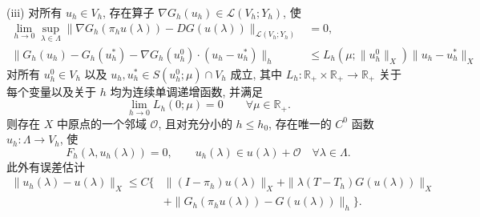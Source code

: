 \begin{Theorem}
\textup{(iii)} 对所有 $u_h\in V_h$, 存在算子
$\nabla G_h(u_h)\in\mathcal L(V_h;Y_h)$, 使
\begin{align}
\lim_{h\to0}\sup_{\lambda\in\Lambda}
\|\nabla G_h(\pi_hu(\lambda))-DG(u(\lambda))\|_{\mathcal L(V_h;Y_h)}&=0,
\label{eq:navier-branch-generalized-gradient-consistency}\\
\|G_h(u_h)-G_h(u_h^*)-\nabla G_h(u_h^0)\cdot(u_h-u_h^*)\|_h
&\leq L_h(\mu;\|u_h^0\|_X)\|u_h-u_h^*\|_X
\label{eq:navier-branch-gh-generalized-lipschitz}
\end{align}
对所有 $u_h^0\in V_h$ 以及
$u_h,u_h^*\in S(u_h^0;\mu)\cap V_h$ 成立, 其中
$L_h:\mathbb R_+\times\mathbb R_+\to\mathbb R_+$ 关于每个变量以及关于 $h$
均为连续单调递增函数, 并满足
\begin{equation}\label{eq:navier-branch-lh-zero-limit}
\lim_{h\to0}L_h(0;\mu)=0
\qquad\forall\mu\in\mathbb R_+.
\end{equation}
则存在 $X$ 中原点的一个邻域 $\mathcal O$, 且对充分小的 $h\leq h_0$,
存在唯一的 $C^0$ 函数 $u_h:\Lambda\to V_h$, 使
\begin{equation}\label{eq:navier-branch-nondifferentiable-solution}
F_h(\lambda,u_h(\lambda))=0,
\qquad u_h(\lambda)\in u(\lambda)+\mathcal O
\quad\forall\lambda\in\Lambda.
\end{equation}
此外有误差估计
\begin{equation}\label{eq:navier-branch-nondifferentiable-error}
\begin{aligned}
\|u_h(\lambda)-u(\lambda)\|_X\leq C\big\{
&\|(I-\pi_h)u(\lambda)\|_X
+\|\lambda(T-T_h)G(u(\lambda))\|_X\\
&+\|G_h(\pi_hu(\lambda))-G(u(\lambda))\|_h\big\}.
\end{aligned}
\end{equation}
\end{Theorem}
